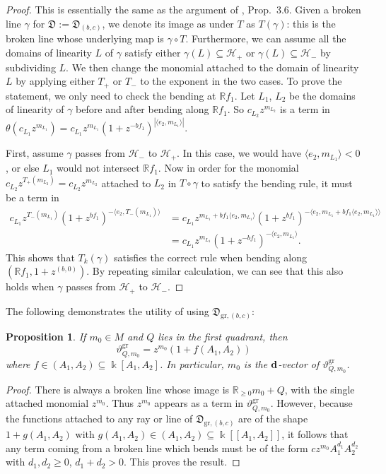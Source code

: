 \documentclass[12pt]{amsart}
\newtheorem{prop}[theorem]{Proposition}
\theoremstyle{remark}
\newcommand{\RR}{\mathbb{R}}
\newcommand{\DD}{\mathfrak{D}}
\newcommand{\gr}{\mathrm{gr}}
\begin{document}
\begin{proof}
This is essentially the same as the argument of \cite{GHKK}, Prop.\ 3.6.
Given a broken line $\gamma$ for $\DD:=\DD_{(b,c)}$, we denote its image as 
under $T$ as $T(\gamma)$: this is the broken line whose underlying map
is $\gamma\circ T$. Furthermore, we can assume all the domains of linearity 
$L$ of $\gamma$ satisfy either $\gamma(L) \subseteq \mathcal{H}_{+} $ or $
\gamma(L)\subseteq \mathcal{H}_{-}$ by subdividing $L$. We then change
the monomial attached to the domain of linearity $L$ by applying either
$T_+$ or $T_-$ to the exponent in the two cases.
To prove the statement, we only need to check the bending at $\RR f_1$. Let $L_1$, $L_2$ be the domains of linearity of $\gamma$ before and after bending along
$\RR f_1$. So $c_{L_2} z^{m_{L_2}}$ is a term in
$\theta (c_{L_1} z^{m_{L_1}}) = c_{L_1} z^{m_{L_1}} (1+z^{-bf_1}) ^{|\langle  e_2, m_{L_1}  \rangle|} $. 

First, assume $\gamma$ passes from $\mathcal{H}_-$ to $\mathcal{H}_+$. In this case, we would have $\langle e_2 , m_{L_1} \rangle < 0$, or else $L_1$ would
not intersect $\RR f_1$. Now in order for the monomial $c_{L_2}z^{T_+(m_{L_2})}
=c_{L_2}z^{m_{L_2}}$
attached to $L_2$
in $T\circ\gamma$ to satisfy the bending rule, it must be a term in
\begin{align*} 
c_{L_1} z^{T_-(m_{L_1})} (1+z^{bf_1}) ^{-\langle  e_2, T_-(m_{L_1}) \rangle} & =
c_{L_1} z^{m_{L_1}+bf_1\langle e_2, m_{L_1}\rangle} (1+z^{bf_1}) ^{-\langle  e_2, 
m_{L_1}+bf_1\langle e_2, m_{L_1} \rangle \rangle} \\
& = c_{L_1} z^{m_{L_1}} (1+z^{-bf_1}) ^{-\langle  e_2, m_{L_1}  \rangle}.
\end{align*}
This shows that $T_k(\gamma)$ satisfies the correct rule when bending along
$(\RR f_1, 1+z^{(b,0)})$. By repeating similar calculation, we can see that this also holds when $\gamma$ passes from $\mathcal{H}_+$ to $\mathcal{H}_-$.
\end{proof}

The following demonstrates the utility of using $\DD_{\gr,(b,c)}$:

\begin{prop}
If $m_0\in M$ and $Q$ lies in the first quadrant, then 
\[
\vartheta^{\gr}_{Q, m_0}=z^{m_0}(1+f(A_1,A_2))
\]
where $f\in (A_1,A_2)\subseteq \Bbbk[A_1,A_2]$.
In particular, $m_0$ is the ${\bf d}$-vector of $\vartheta^{\gr}_{Q,m_0}$.
\end{prop}

\begin{proof}
There is always a broken line whose image is $\RR_{\ge 0}m_0+Q$, with
the single attached monomial $z^{m_0}$. Thus $z^{m_0}$ appears as a term
in $\vartheta^{\gr}_{Q,m_0}$. However, because the functions attached
to any ray or line of $\DD_{\gr,(b,c)}$ are of the shape $1+g(A_1,A_2)$
with $g(A_1,A_2) \in (A_1,A_2) \subseteq \Bbbk[[A_1,A_2]]$, it follows
that any term coming from a broken line which bends must be of the form
$cz^{m_0}A_1^{d_1}A_2^{d_2}$ with $d_1,d_2\ge 0$, $d_1+d_2>0$. This proves
the result.
\end{proof}
\end{document}
